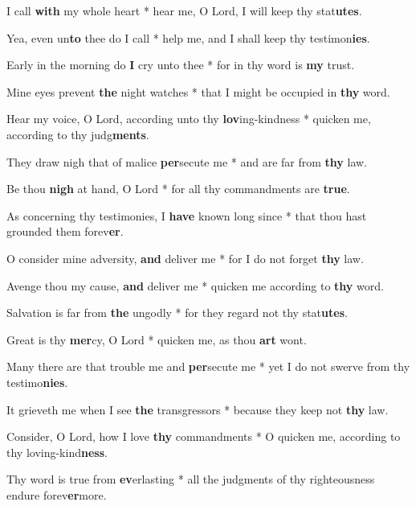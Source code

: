\begin{multicols}{2}
	I call \textbf{with} my whole heart * hear me, O Lord, I will keep thy stat\textbf{utes}.
	
	Yea, even un\textbf{to} thee do I call * help me, and I shall keep thy testimon\textbf{ies}.
	
	Early in the morning do \textbf{I} cry unto thee * for in thy word is \textbf{my} trust.
	
	Mine eyes prevent \textbf{the} night watches * that I might be occupied in \textbf{thy} word.
	
	Hear my voice, O Lord, according unto thy \textbf{lov}ing-kindness * quicken me, according to thy judg\textbf{ments}.
	
	They draw nigh that of malice \textbf{per}secute me * and are far from \textbf{thy} law.
	
	Be thou \textbf{nigh} at hand, O Lord * for all thy commandments are \textbf{true}.
	
	As concerning thy testimonies, I \textbf{have} known long since * that thou hast grounded them forev\textbf{er}.
	
	O consider mine adversity, \textbf{and} deliver me * for I do not forget \textbf{thy} law.
	
	Avenge thou my cause, \textbf{and} deliver me * quicken me according to \textbf{thy} word.
	
	Salvation is far from \textbf{the} ungodly * for they regard not thy stat\textbf{utes}.
	
	Great is thy \textbf{mer}cy, O Lord * quicken me, as thou \textbf{art} wont.
	
	Many there are that trouble me and \textbf{per}secute me * yet I do not swerve from thy testimo\textbf{nies}.
	
	It grieveth me when I see \textbf{the} transgressors * because they keep not \textbf{thy} law.
	
	Consider, O Lord, how I love \textbf{thy} commandments * O quicken me, according to thy loving-kind\textbf{ness}.
	
	Thy word is true from \textbf{ev}erlasting * all the judgments of thy righteousness endure forev\textbf{er}more.
\end{multicols}